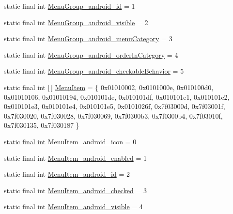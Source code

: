 \begin{DoxyCompactItemize}
static final int \mbox{\hyperlink{classandroid_1_1support_1_1v7_1_1appcompat_1_1R_1_1styleable_aa28bf61b5e9fc2bc1caa2448356ffe73}{Menu\+Group\+\_\+android\+\_\+id}} = 1
\item 
static final int \mbox{\hyperlink{classandroid_1_1support_1_1v7_1_1appcompat_1_1R_1_1styleable_af089eb8abf30585bb699a2294320dc62}{Menu\+Group\+\_\+android\+\_\+visible}} = 2
\item 
static final int \mbox{\hyperlink{classandroid_1_1support_1_1v7_1_1appcompat_1_1R_1_1styleable_a72c3459b8e89065ee52e7671aa730693}{Menu\+Group\+\_\+android\+\_\+menu\+Category}} = 3
\item 
static final int \mbox{\hyperlink{classandroid_1_1support_1_1v7_1_1appcompat_1_1R_1_1styleable_a7506eb5fe31e003b3fae2058ac082d38}{Menu\+Group\+\_\+android\+\_\+order\+In\+Category}} = 4
\item 
static final int \mbox{\hyperlink{classandroid_1_1support_1_1v7_1_1appcompat_1_1R_1_1styleable_a1bcc9736c90fcc22e60ad3d40e6e54ed}{Menu\+Group\+\_\+android\+\_\+checkable\+Behavior}} = 5
\item 
static final int \mbox{[}$\,$\mbox{]} \mbox{\hyperlink{classandroid_1_1support_1_1v7_1_1appcompat_1_1R_1_1styleable_a3161bf75811c963572105d304c98b088}{Menu\+Item}} = \{ 0x01010002, 0x0101000e, 0x010100d0, 0x01010106, 0x01010194, 0x010101de, 0x010101df, 0x010101e1, 0x010101e2, 0x010101e3, 0x010101e4, 0x010101e5, 0x0101026f, 0x7f03000d, 0x7f03001f, 0x7f030020, 0x7f030028, 0x7f030069, 0x7f0300b3, 0x7f0300b4, 0x7f03010f, 0x7f030135, 0x7f030187 \}
\item 
static final int \mbox{\hyperlink{classandroid_1_1support_1_1v7_1_1appcompat_1_1R_1_1styleable_a929c5f72b94b9937bcb487bfd6a5bd5a}{Menu\+Item\+\_\+android\+\_\+icon}} = 0
\item 
static final int \mbox{\hyperlink{classandroid_1_1support_1_1v7_1_1appcompat_1_1R_1_1styleable_a22432eccfda7e6bea733708798b8b43f}{Menu\+Item\+\_\+android\+\_\+enabled}} = 1
\item 
static final int \mbox{\hyperlink{classandroid_1_1support_1_1v7_1_1appcompat_1_1R_1_1styleable_abbb8e70843a1d51b8a7b1231fe92be5b}{Menu\+Item\+\_\+android\+\_\+id}} = 2
\item 
static final int \mbox{\hyperlink{classandroid_1_1support_1_1v7_1_1appcompat_1_1R_1_1styleable_a1c1585a4f41fd9e947f5c4720a0b5ff3}{Menu\+Item\+\_\+android\+\_\+checked}} = 3
\item 
static final int \mbox{\hyperlink{classandroid_1_1support_1_1v7_1_1appcompat_1_1R_1_1styleable_aec2b017060367d3fccc7b214fd12df1b}{Menu\+Item\+\_\+android\+\_\+visible}} = 4

\end{DoxyCompactItemize}
